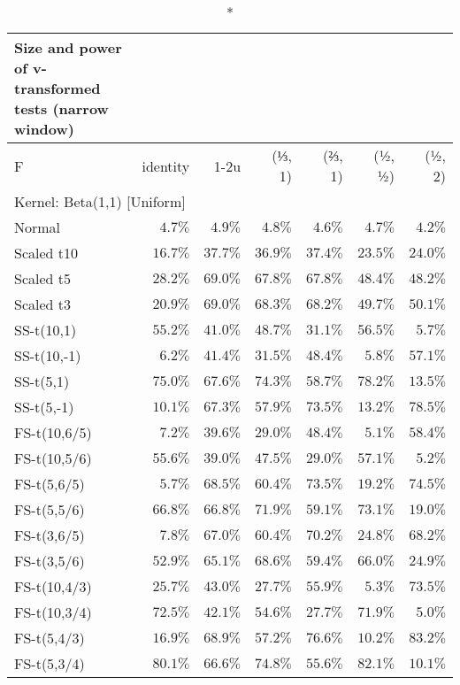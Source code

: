 \setlength{\LTpost}{0mm}
\begin{longtable}{lrrrrrr}
\caption*{
{\large Size and power of v-transformed tests (narrow window)}
} \\ 
\toprule
F & identity & \textbar{}1-2u\textbar{} & (⅓, 1) & (⅔, 1) & (½, ½) & (½, 2) \\ 
\midrule
\multicolumn{7}{l}{Kernel: Beta(1,1) [Uniform]} \\ 
\midrule
Normal & $4.7\%$ & $4.9\%$ & $4.8\%$ & $4.6\%$ & $4.7\%$ & $4.2\%$ \\ 
Scaled t10 & $16.7\%$ & $37.7\%$ & $36.9\%$ & $37.4\%$ & $23.5\%$ & $24.0\%$ \\ 
Scaled t5 & $28.2\%$ & $69.0\%$ & $67.8\%$ & $67.8\%$ & $48.4\%$ & $48.2\%$ \\ 
Scaled t3 & $20.9\%$ & $69.0\%$ & $68.3\%$ & $68.2\%$ & $49.7\%$ & $50.1\%$ \\ 
SS-t(10,1) & $55.2\%$ & $41.0\%$ & $48.7\%$ & $31.1\%$ & $56.5\%$ & $5.7\%$ \\ 
SS-t(10,-1) & $6.2\%$ & $41.4\%$ & $31.5\%$ & $48.4\%$ & $5.8\%$ & $57.1\%$ \\ 
SS-t(5,1) & $75.0\%$ & $67.6\%$ & $74.3\%$ & $58.7\%$ & $78.2\%$ & $13.5\%$ \\ 
SS-t(5,-1) & $10.1\%$ & $67.3\%$ & $57.9\%$ & $73.5\%$ & $13.2\%$ & $78.5\%$ \\ 
FS-t(10,6/5) & $7.2\%$ & $39.6\%$ & $29.0\%$ & $48.4\%$ & $5.1\%$ & $58.4\%$ \\ 
FS-t(10,5/6) & $55.6\%$ & $39.0\%$ & $47.5\%$ & $29.0\%$ & $57.1\%$ & $5.2\%$ \\ 
FS-t(5,6/5) & $5.7\%$ & $68.5\%$ & $60.4\%$ & $73.5\%$ & $19.2\%$ & $74.5\%$ \\ 
FS-t(5,5/6) & $66.8\%$ & $66.8\%$ & $71.9\%$ & $59.1\%$ & $73.1\%$ & $19.0\%$ \\ 
FS-t(3,6/5) & $7.8\%$ & $67.0\%$ & $60.4\%$ & $70.2\%$ & $24.8\%$ & $68.2\%$ \\ 
FS-t(3,5/6) & $52.9\%$ & $65.1\%$ & $68.6\%$ & $59.4\%$ & $66.0\%$ & $24.9\%$ \\ 
FS-t(10,4/3) & $25.7\%$ & $43.0\%$ & $27.7\%$ & $55.9\%$ & $5.3\%$ & $73.5\%$ \\ 
FS-t(10,3/4) & $72.5\%$ & $42.1\%$ & $54.6\%$ & $27.7\%$ & $71.9\%$ & $5.0\%$ \\ 
FS-t(5,4/3) & $16.9\%$ & $68.9\%$ & $57.2\%$ & $76.6\%$ & $10.2\%$ & $83.2\%$ \\ 
FS-t(5,3/4) & $80.1\%$ & $66.6\%$ & $74.8\%$ & $55.6\%$ & $82.1\%$ & $10.1\%$ \\ 

\end{longtable}
